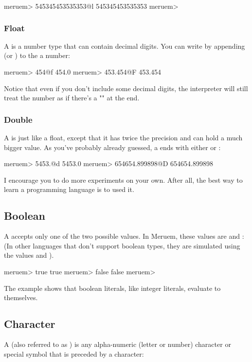 \begin{REPL}
meruem> 545345453535353@l
545345453535353
meruem>
\end{REPL}

\subsubsection{Float}
A  is a number type that can contain decimal digits. You can write  by appending  (or ) to the a number:

\begin{REPL}
meruem> 454@f
454.0
meruem> 453.454@F
453.454
\end{REPL}

Notice that even if you don't include some decimal digits, the interpreter will still treat the number as if there's a "" at the end.

\subsubsection{Double}
A  is just like a float, except that it has twice the precision and can hold a much bigger value. As you've probably already guessed, a  ends with either  or :

\begin{REPL}
meruem> 5453.@d
5453.0
meruem> 654654.899898@D
654654.899898
\end{REPL}

I encourage you to do more experiments on your own. After all, the best way to learn a programming language is to used it.

\subsection{Boolean}
A  accepts only one of the two possible values. In Meruem, these values are  and : (In other languages that don't support boolean types, they are simulated using the values  and ). 

\begin{REPL}
meruem> true
true
meruem> false
false
meruem>  
\end{REPL}

The example shows that boolean literals, like integer literals, evaluate to themselves.

\subsection{Character}
A  (also referred to as ) is any alpha-numeric (letter or number) character or special symbol that is preceded by a \code{\textbackslash} character:

